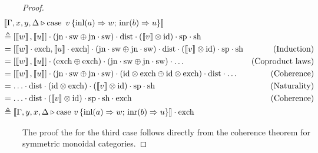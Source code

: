 \begin{proof}
\begin{align*}
  & \hspace{-30pt} \sem{\Gamma,x, y, \Delta \vljud \text{case } \, v\, \{\text{inl} (a) \Rightarrow w ;\, \text{inr} (b) \Rightarrow u\}} \\
  & \hspace{-30pt} \triangleq  [\sem{w} ,\sem{u}]\comp (\text{jn}
  \comp \sw \oplus \text{jn} \comp \sw) 
  \comp \dist \comp (\sem{v} \otimes \id) \comp 
  \text{sp}_{} 
  \comp \text{sh}_{}  \\
  & \hspace{-30pt} = [\sem{ w }  \comp \text{exch}, \sem{u}\comp \text{exch}] \comp (\text{jn}\comp \sw \oplus \text{jn} \comp \sw) \comp \dist \comp (\sem{v} \otimes \id) \comp\text{sp} \comp \text{sh}
  & \text{(Induction)}\\
  &\hspace{-30pt} = [\sem{ w }, \sem{u}] 
  \comp (\text{exch} \oplus \text{exch}) 
  \comp (\text{jn}\comp \sw \oplus \text{jn} \comp \sw) 
  \comp \ldots
  & \text{(Coproduct laws)}
  \\
  & \hspace{-30pt} = [\sem{ w }, \sem{u}] 
  \comp (\text{jn}\comp \sw \oplus \text{jn} \comp \sw) 
  \comp (\id \otimes \text{exch} \oplus \id \otimes \text{exch})
  \comp \dist \comp \ldots
  & \text{(Coherence)}
  \\
  & \hspace{-30pt} = \ldots 
  \comp \dist 
  \comp (\id \otimes \text{exch}) \comp (\sem{v} \otimes \id) \comp\text{sp} \comp \text{sh} 
  & \text{(Naturality)}
  \\
  & \hspace{-30pt} = \ldots
  \comp \dist 
  \comp (\sem{v} \otimes \id) \comp\text{sp} \comp \text{sh} 
  \comp \text{exch}
  & \text{(Coherence)}
  \\
  & \hspace{-30pt} \triangleq \sem{\Gamma,y, x, \Delta \vljud \text{case } v\,  \{\text{inl} (a) \Rightarrow w ;\, \text{inr} (b) \Rightarrow u\}} 
  \comp \text{exch}_{}
\end{align*}

The proof the for the third case follows directly from the coherence theorem
for symmetric monoidal categories.


\end{proof}
